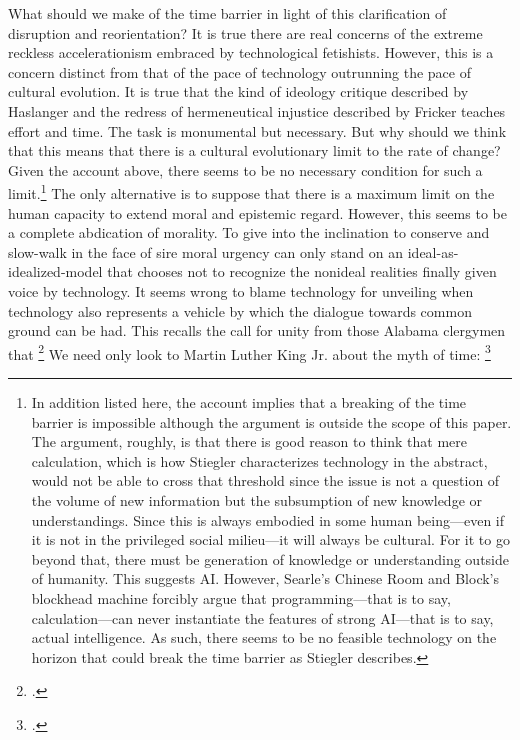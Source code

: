 \documentclass[letterpaper,notitlepage,12pt]{article}
\begin{document}
{What should we make of the time barrier in light of this clarification of
disruption and reorientation?
It is true there are real concerns of the extreme reckless accelerationism
embraced by technological fetishists.
However, this is a concern distinct from that of the pace of technology
outrunning the pace of cultural evolution.
It is true that the kind of ideology critique described by Haslanger and the
redress of hermeneutical injustice described by Fricker teaches effort and time.
The task is monumental but necessary.
But why should we think that this means that there is a cultural evolutionary
limit to the rate of change?
Given the account above, there seems to be no necessary condition for such a
limit.\footnote{In addition listed here, the account implies that a breaking of
  the time barrier is impossible although the argument is outside the scope of
  this paper. The argument, roughly, is that there is good reason to think that
mere calculation, which is how Stiegler characterizes technology in the 
abstract, would not be able to cross that threshold since the issue is not a
question of the volume of new information but the subsumption of new knowledge
or understandings. Since this is always embodied in some human being---even if
it is not in the privileged social milieu---it will always be cultural. For it
to go beyond that, there must be generation of knowledge or understanding
outside of humanity. This suggests AI. However, Searle's Chinese Room and
Block's blockhead machine forcibly argue that programming---that is to say,
calculation---can never instantiate the features of strong AI---that is to say,
actual intelligence. As such, there seems to be no feasible technology on the
horizon that could break the time barrier as Stiegler describes.}
The only alternative is to suppose that there is a maximum limit on the human
capacity to extend moral and epistemic regard.
However, this seems to be a complete abdication of morality.
To give into the inclination to conserve and slow-walk in the face of sire moral
urgency can only stand on an ideal-as-idealized-model that chooses not to
recognize the nonideal realities finally given voice by technology.
It seems wrong to blame technology for unveiling when technology also represents
a vehicle by which the dialogue towards common ground can be had.
This recalls the call for unity  from those Alabama clergymen that 
\footcite{noauthor_white_1963}
We need only look to Martin Luther King Jr. about the myth of time:
\footcite{king_letter_2018}

}
\end{document}
